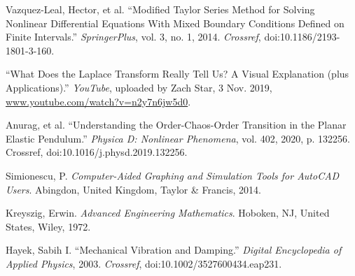 \begin{thebibliography}{12}


Vazquez-Leal, Hector, et al. “Modified Taylor Series Method for Solving Nonlinear Differential Equations With Mixed Boundary Conditions Defined on Finite Intervals.” \emph{SpringerPlus}, vol. 3, no. 1, 2014. \emph{Crossref}, doi:10.1186/2193-1801-3-160.

“What Does the Laplace Transform Really Tell Us? A Visual Explanation (plus Applications).” \emph{YouTube}, uploaded by Zach Star, 3 Nov. 2019, \url{www.youtube.com/watch?v=n2y7n6jw5d0}.




Anurag, et al. “Understanding the Order-Chaos-Order Transition in the Planar Elastic Pendulum.” \emph{Physica D: Nonlinear Phenomena}, vol. 402, 2020, p. 132256. Crossref, doi:10.1016/j.physd.2019.132256.

Simionescu, P. \emph{Computer-Aided Graphing and Simulation Tools for AutoCAD Users}. Abingdon, United Kingdom, Taylor & Francis, 2014.

Kreyszig, Erwin. \emph{Advanced Engineering Mathematics}. Hoboken, NJ, United States, Wiley, 1972.

Hayek, Sabih I. “Mechanical Vibration and Damping.” \emph{Digital Encyclopedia of Applied Physics}, 2003. \emph{Crossref}, doi:10.1002/3527600434.eap231.


\end{thebibliography}

